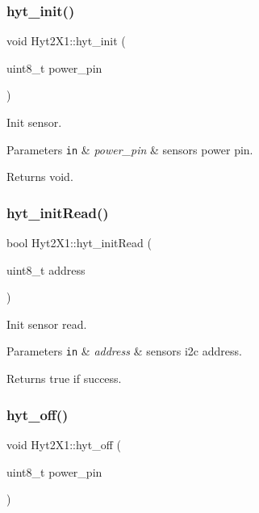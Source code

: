 \subsubsection{\texorpdfstring{hyt\+\_\+init()}{hyt\_init()}}
{\footnotesize\ttfamily void Hyt2\+X1\+::hyt\+\_\+init (\begin{DoxyParamCaption}\item[{uint8\+\_\+t}]{power\+\_\+pin }\end{DoxyParamCaption})}



Init sensor. 


\begin{DoxyParams}[1]{Parameters}
\mbox{\tt in}  & {\em power\+\_\+pin} & sensors power pin. \\
\hline
\end{DoxyParams}
\begin{DoxyReturn}{Returns}
void. 
\end{DoxyReturn}
\mbox{\label{namespaceHyt2X1_a5c47620fc3a7b6573620f84f26d33ab5}} 
\subsubsection{\texorpdfstring{hyt\+\_\+init\+Read()}{hyt\_initRead()}}
{\footnotesize\ttfamily bool Hyt2\+X1\+::hyt\+\_\+init\+Read (\begin{DoxyParamCaption}\item[{uint8\+\_\+t}]{address }\end{DoxyParamCaption})}



Init sensor read. 


\begin{DoxyParams}[1]{Parameters}
\mbox{\tt in}  & {\em address} & sensors i2c address. \\
\hline
\end{DoxyParams}
\begin{DoxyReturn}{Returns}
true if success. 
\end{DoxyReturn}
\mbox{\label{namespaceHyt2X1_a950d46e4e993f893d99139d0443d7ca3}} 
\subsubsection{\texorpdfstring{hyt\+\_\+off()}{hyt\_off()}}
{\footnotesize\ttfamily void Hyt2\+X1\+::hyt\+\_\+off (\begin{DoxyParamCaption}\item[{uint8\+\_\+t}]{power\+\_\+pin }\end{DoxyParamCaption})}



